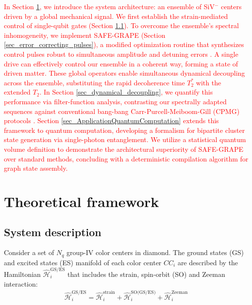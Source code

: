 \documentclass[%
 reprint,
 superscriptaddress,
 amsmath,amssymb,
 aps,
 prx,
]{revtex4-2}
\newcommand{\rev}[1]{\textcolor{red}{#1}}
\newcounter{algorithm} %
\begin{document}
\rev{In Section \ref{sec_theoretical_framework}, we introduce the system architecture: an ensemble of SiV$^-$ centers driven by a global mechanical signal. We first establish the strain-mediated control of single-qubit gates (Section \ref{sec_system_description}). To overcome the ensemble's spectral inhomogeneity, we implement SAFE-GRAPE (Section \ref{sec_error_correcting_pulses}), a modified optimization routine that synthesizes control pulses robust to simultaneous amplitude and detuning errors \cite{khaneja_optimal_2005, PhysRevA.80.032303}. A single drive can effectively control our ensemble in a coherent way, forming a state of driven matter. These global operators enable simultaneous dynamical decoupling across the ensemble, substituting the rapid decoherence time $T_2^*$ with the extended $T_2$. In Section \ref{sec_dynamical_decoupling}, we quantify this performance via filter-function analysis, contrasting our spectrally adapted sequences against conventional bang-bang Carr-Purcell-Meiboom-Gill (CPMG) protocols \cite{PhysRev.94.630, meiboom_modified_1958}. Section \ref{sec_ApplicationQuantumComputation} extends this framework to quantum computation, developing a formalism for bipartite cluster state generation via single-photon entanglement. We utilize a statistical quantum volume definition \cite{Cross_2019} to demonstrate the architectural superiority of SAFE-GRAPE over standard methods, concluding with a deterministic compilation algorithm for graph state assembly.}


\section{Theoretical framework}
\label{sec_theoretical_framework}

\subsection{System description}
\label{sec_system_description}

Consider a set of $N_q$ group-IV color centers in diamond. The ground states (GS) and excited states (ES) manifold of each color center $CC_i$ are described by the Hamiltonian $\hat{\mathcal{H}
 }_i^{\text{GS/ES}}$ that includes the strain, spin-orbit (SO) and Zeeman interaction: 
 \begin{align}
 \hat{\mathcal{H}}_i^{\text{GS/ES}} = \hat{\mathcal{H}}_i^{\text{strain}} + \hat{\mathcal{H}}_i^{\text{SO(GS/ES)}} + \hat{\mathcal{H}}_i^{\text{Zeeman}}
 \end{align}
\end{document}
